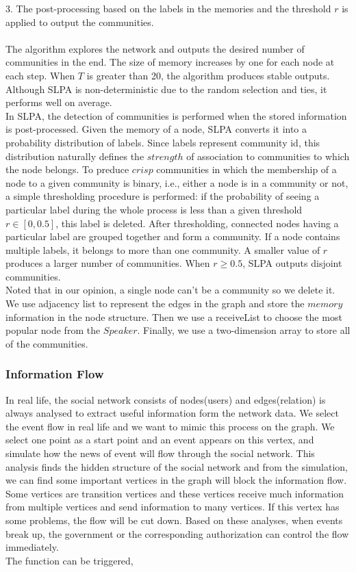 \documentclass{article}
\begin{document}
3. The post-processing based on the labels in the memories and the threshold $r$ is applied to output the communities.\\\\
The algorithm explores the network and outputs the desired number of communities in the end. The size of memory increases by one for each node at each step. When $T$ is greater than 20, the algorithm produces stable outputs. Although SLPA is non-deterministic due to the random selection and ties, it performs well on average.\\
In SLPA, the detection of communities is performed when the stored information is post-processed. Given the memory of a node, SLPA converts it into a probability distribution of labels. Since labels represent community id, this distribution naturally defines the $strength$ of association to communities to which the node belongs. To preduce $crisp$ communities in which the membership of a node to a given community is binary, i.e., either a node is in a community or not, a simple thresholding procedure is performed: if the probability of seeing a particular label during the whole process is less than a given threshold $r \in [0, 0.5]$, this label is deleted. After thresholding, connected nodes having a particular label are grouped together and form a community. If a node contains multiple labels, it belongs to more than one community. A smaller value of $r$ produces a larger number of communities. When $r\geq 0.5$, SLPA outputs disjoint communities.\\
Noted that in our opinion, a single node can't be a community so we delete it.\\
We use adjacency list to represent the edges in the graph and store the $memory$ information in the node structure. Then we use a receiveList to choose the most popular node from the $Speaker$. Finally, we use a two-dimension array to store all of the communities.
\subsubsection{Information Flow}
In real life, the social network consists of nodes(users) and edges(relation) is always analysed to extract useful information form the network data. We select the event flow in real life and we want to mimic this process on the graph. We select one point as a start point and an event appears on this vertex, and simulate how the news of event will flow through the social network. This analysis finds the hidden structure of the social network and from the simulation, we can find some important vertices in the graph will block the information flow. Some vertices are transition vertices and these vertices receive much information from multiple vertices and send information to many vertices. If this vertex has some problems, the flow will be cut down. Based on these analyses, when events break up, the government or the corresponding authorization can control the flow immediately.\\
The function can be triggered, 
\end{document}
